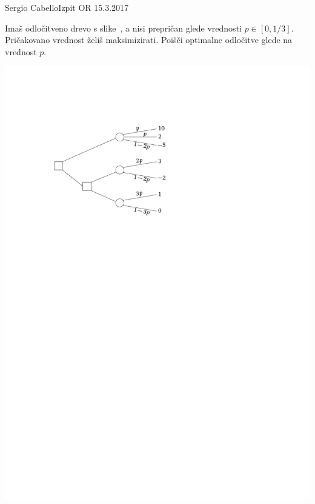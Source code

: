 \begin{naloga}{Sergio Cabello}{Izpit OR 15.3.2017}
\begin{vprasanje}[dectree]
Imaš odločitveno drevo s slike~\fig{},
a nisi prepričan glede vrednosti $p \in [0, 1/3]$.
Pričakovano vrednost želiš maksimizirati.
Poišči optimalne odločitve glede na vrednost $p$.

\begin{slika}
\includegraphics{slike/decision-tree.pdf}
\end{slika}
\end{vprasanje}
\begin{odgovor}
\end{odgovor}
\end{naloga}


